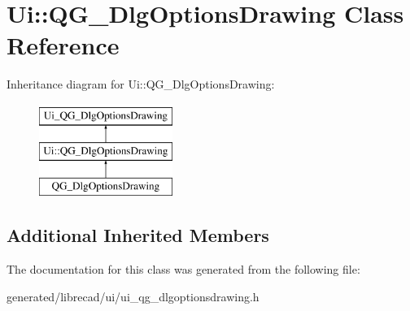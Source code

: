 \hypertarget{classUi_1_1QG__DlgOptionsDrawing}{\section{Ui\-:\-:Q\-G\-\_\-\-Dlg\-Options\-Drawing Class Reference}
\label{classUi_1_1QG__DlgOptionsDrawing}
}
Inheritance diagram for Ui\-:\-:Q\-G\-\_\-\-Dlg\-Options\-Drawing\-:\begin{figure}[H]
\begin{center}
\leavevmode
\includegraphics[height=3.000000cm]{classUi_1_1QG__DlgOptionsDrawing}
\end{center}
\end{figure}
\subsection*{Additional Inherited Members}


The documentation for this class was generated from the following file\-:\begin{DoxyCompactItemize}
\item 
generated/librecad/ui/ui\-\_\-qg\-\_\-dlgoptionsdrawing.\-h\end{DoxyCompactItemize}
